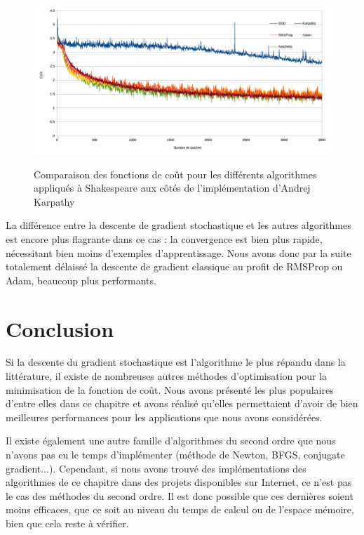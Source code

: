\begin{figure}[!h]
\begin{center}
	{\includegraphics[scale=0.4]{images/chapter8/comparison.png}\label{Algorithmes}}
  \caption{Comparaison des fonctions de coût pour les différents algorithmes appliqués à Shakespeare aux côtés de l'implémentation d'Andrej Karpathy}
\end{center}
\end{figure}

La différence entre la descente de gradient stochastique et les autres algorithmes est encore plus flagrante dans ce cas : la convergence est bien plus rapide, nécessitant bien moins d'exemples d'apprentissage. Nous avons donc par la suite totalement délaissé la descente de gradient classique au profit de RMSProp ou Adam, beaucoup plus performants.

\section {Conclusion}
Si la descente du gradient stochastique est l'algorithme le plus répandu dans la littérature, il existe de nombreuses autres méthodes d'optimisation pour la minimisation de la fonction de coût. Nous avons présenté les plus populaires d'entre elles dans ce chapitre et avons réalisé qu'elles permettaient d'avoir de bien meilleures performances pour les applications que nous avons considérées. 

Il existe également une autre famille d'algorithmes du second ordre que nous n'avons pas eu le temps d'implémenter (méthode de Newton, BFGS, conjugate gradient...). Cependant, si nous avons trouvé des implémentations des algorithmes de ce chapitre dans des projets disponibles sur Internet, ce n'est pas le cas des méthodes du second ordre. Il est donc possible que ces dernières soient moins efficaces, que ce soit au niveau du temps de calcul ou de l'espace mémoire, bien que cela reste à vérifier.